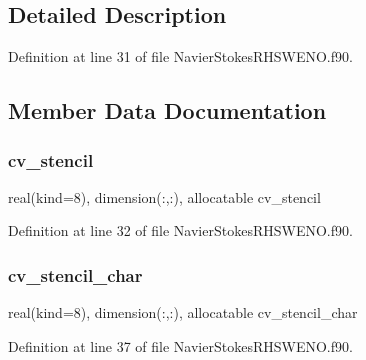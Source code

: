 \subsection{Detailed Description}


Definition at line 31 of file Navier\+Stokes\+R\+H\+S\+W\+E\+N\+O.\+f90.



\subsection{Member Data Documentation}
\hypertarget{structnavierstokesrhsweno_1_1dissipation__local_ade9c2cbe91755a09f90a172dd674e4e2}{}\label{structnavierstokesrhsweno_1_1dissipation__local_ade9c2cbe91755a09f90a172dd674e4e2} 
\subsubsection{\texorpdfstring{cv\+\_\+stencil}{cv\_stencil}}
{\footnotesize\ttfamily real(kind=8), dimension(\+:,\+:), allocatable cv\+\_\+stencil}



Definition at line 32 of file Navier\+Stokes\+R\+H\+S\+W\+E\+N\+O.\+f90.

\hypertarget{structnavierstokesrhsweno_1_1dissipation__local_a97db556486d557994c1e7e8cf387a6c2}{}\label{structnavierstokesrhsweno_1_1dissipation__local_a97db556486d557994c1e7e8cf387a6c2} 
\subsubsection{\texorpdfstring{cv\+\_\+stencil\+\_\+char}{cv\_stencil\_char}}
{\footnotesize\ttfamily real(kind=8), dimension(\+:,\+:), allocatable cv\+\_\+stencil\+\_\+char}



Definition at line 37 of file Navier\+Stokes\+R\+H\+S\+W\+E\+N\+O.\+f90.

\hypertarget{structnavierstokesrhsweno_1_1dissipation__local_ad7daefaf4894be9ce008e1ba521c9833}{}\label{structnavierstokesrhsweno_1_1dissipation__local_ad7daefaf4894be9ce008e1ba521c9833} 
